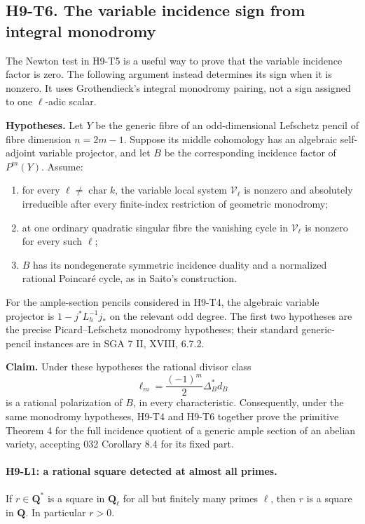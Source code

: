 
\subsection*{H9-T6. The variable incidence sign from integral monodromy}

The Newton test in H9-T5 is a useful way to prove that the variable
incidence factor is zero. The following argument instead determines its
sign when it is nonzero. It uses Grothendieck's integral monodromy pairing,
not a sign assigned to one $\ell$-adic scalar.

\textbf{Hypotheses.} Let $Y$ be the generic fibre of an odd-dimensional
Lefschetz pencil of fibre dimension $n=2m-1$. Suppose its middle
cohomology has an algebraic self-adjoint variable projector, and let
$B$ be the corresponding incidence factor of $P^m(Y)$. Assume:
\begin{enumerate}
\item for every $\ell\ne\operatorname{char}k$, the variable local system
      $\mathcal V_\ell$ is nonzero and absolutely irreducible after every
      finite-index restriction of geometric monodromy;
\item at one ordinary quadratic singular fibre the vanishing cycle in
      $\mathcal V_\ell$ is nonzero for every such $\ell$;
\item $B$ has its nondegenerate symmetric incidence duality and a
      normalized rational Poincar\'e cycle, as in Saito's construction.
\end{enumerate}
For the ample-section pencils considered in H9-T4, the algebraic variable
projector is $1-j^*L_h^{-1}j_*$ on the relevant odd degree. The first two
hypotheses are the precise Picard--Lefschetz monodromy hypotheses; their
standard generic-pencil instances are in SGA 7 II, XVIII, 6.7.2.

\textbf{Claim.} Under these hypotheses the rational divisor class
\[
 \ell_m=\frac{(-1)^m}{2}\Delta_B^*d_B
\]
is a rational polarization of $B$, in every characteristic. Consequently,
under the same monodromy hypotheses, H9-T4 and H9-T6 together prove the
primitive Theorem 4 for the full incidence quotient of a generic ample
section of an abelian variety, accepting 032 Corollary 8.4 for its fixed
part.

\paragraph{H9-L1: a rational square detected at almost all primes.}
If $r\in\mathbf Q^*$ is a square in $\mathbf Q_\ell$ for all but
finitely many primes $\ell$, then $r$ is a square in $\mathbf Q$.
In particular $r>0$.

